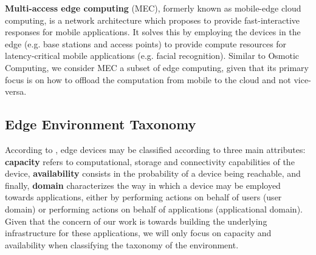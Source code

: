 \textbf{Multi-access edge computing} \cite{mobile_edge_cloud} (MEC), formerly known as mobile-edge cloud computing, is a network architecture which proposes to provide fast-interactive responses for mobile applications. It solves this by employing the devices in the edge (e.g. base stations and access points) to provide compute resources for latency-critical mobile applications (e.g. facial recognition). Similar to Osmotic Computing, we consider MEC a subset of edge computing, given that its primary focus is on how to offload the computation from mobile to the cloud and not vice-versa. 

\subsection{Edge Environment Taxonomy} \label{subsec:edge_taxonomy}

According to \textcite{Leitao2018}, edge devices may be classified according to three main attributes: \textbf{capacity} refers to computational, storage and connectivity capabilities of the device,  \textbf{availability} consists in the probability of a device being reachable, and finally, \textbf{domain} characterizes the way in which a device may be employed towards applications, either by performing actions on behalf of users (user domain) or performing actions on behalf of applications (applicational domain). Given that the concern of our work is towards building the underlying infrastructure for these applications, we will only focus on capacity and availability when classifying the taxonomy of the environment. 

